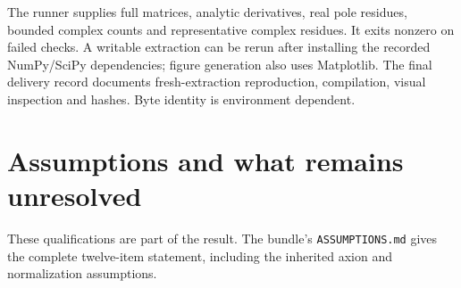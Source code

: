 The runner supplies full matrices, analytic derivatives, real pole residues, bounded complex counts and representative complex residues. It exits nonzero on failed checks. A writable extraction can be rerun after installing the recorded NumPy/SciPy dependencies; figure generation also uses Matplotlib. The final delivery record documents fresh-extraction reproduction, compilation, visual inspection and hashes. Byte identity is environment dependent.

\section{Assumptions and what remains unresolved}

These qualifications are part of the result. The bundle's \texttt{ASSUMPTIONS.md} gives the complete twelve-item statement, including the inherited axion and normalization assumptions.
